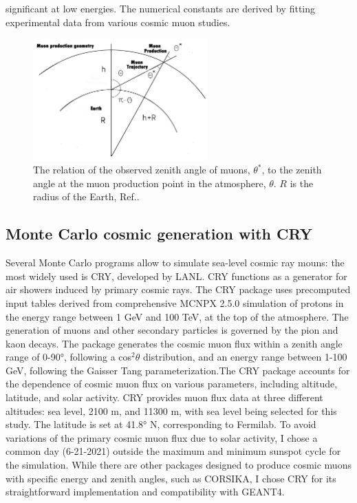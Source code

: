 significant at low energies. The numerical constants are derived by fitting experimental data from various cosmic muon studies.
\begin{figure}[!h]
    \centering
    \includegraphics[width =0.6\textwidth]{figures/png/Screenshot_20240526_140716.png}
    \caption[The relation of $\theta^*$ to $\theta$.]{The relation of the observed zenith angle of muons, $\theta^*$, to 
    the zenith angle at the muon production point in the atmosphere, $\theta$. 
    $R$ is the radius of the Earth, Ref.\cite{guan2015parametrization}.}
    \label{fig:anglesinmuon}
\end{figure}

\subsection{Monte Carlo cosmic generation with CRY}
Several Monte Carlo programs allow to simulate sea-level 
cosmic ray mouns: the most widely used is CRY, developed 
by LANL. CRY functions as a generator for air showers 
induced by primary cosmic rays. The CRY package uses 
precomputed input tables derived from comprehensive 
MCNPX 2.5.0 simulation of protons in the energy range 
between 1 GeV and 100 TeV, at the top of the atmosphere.
The generation of muons and other secondary particles 
is governed by the pion and kaon decays. The package 
generates the cosmic muon flux within a zenith angle range 
of 0-90°, following a cos$^2 \theta$ distribution, and an 
energy range between 1-100 GeV, following the Gaisser 
Tang parameterization.The CRY package accounts for the 
dependence of cosmic muon flux on various parameters, 
including altitude, latitude, and solar activity. CRY 
provides muon flux data at three different altitudes: 
sea level, 2100 m, and 11300 m, with sea level being 
selected for this study. The latitude is set at 41.8° N, 
corresponding to Fermilab. To avoid variations of the 
primary cosmic muon flux due to solar activity, I chose 
a common day (6-21-2021) outside the maximum and minimum 
sunspot cycle for the simulation. While there are other 
packages designed to produce cosmic muons with specific 
energy and zenith angles, such as CORSIKA, I chose CRY 
for its straightforward implementation and compatibility with GEANT4. 

